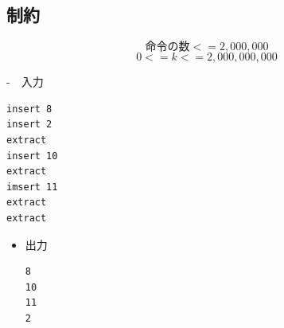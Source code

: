 \documentclass[11pt]{article}
\begin{document}
\subsection{制約}\label{ux5236ux7d04}

\[命令の数 <= 2,000,000\] \[0 <= k <= 2,000,000,000\]

    -　入力

\begin{verbatim}
insert 8
insert 2
extract
insert 10
extract
imsert 11
extract
extract
\end{verbatim}

\begin{itemize}
\item
  出力

\begin{verbatim}
8
10
11
2
\end{verbatim}
\end{itemize}
\end{document}
